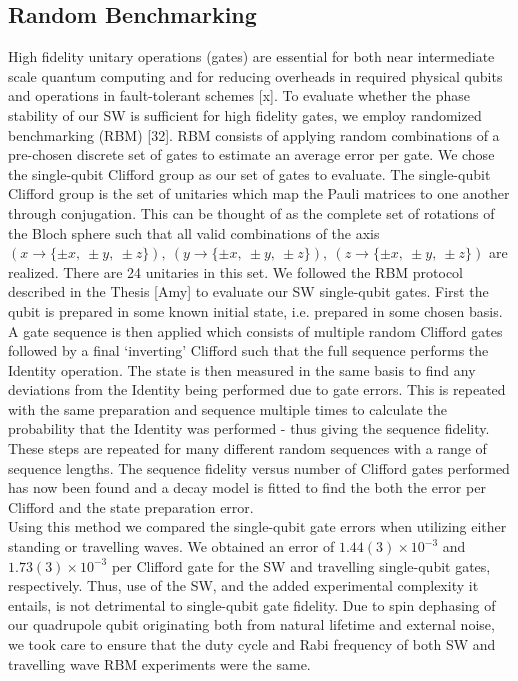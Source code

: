 \documentclass[12pt]{iopart}
\begin{document}
\subsection{Random Benchmarking}

    High fidelity unitary operations (gates) are essential for both
    near intermediate scale quantum computing and for reducing
    overheads in required physical qubits and operations in
    fault-tolerant schemes [x]. To evaluate whether the phase
    stability of our SW is sufficient for high fidelity gates, we
    employ randomized benchmarking (RBM) [32].  RBM consists of
    applying random combinations of a pre-chosen discrete set of gates
    to estimate an average error per gate.  We chose the single-qubit
    Clifford group as our set of gates to evaluate. The single-qubit
    Clifford group is the set of unitaries which map the Pauli
    matrices to one another through conjugation. This can be thought
    of as the complete set of rotations of the Bloch sphere such that
    all valid combinations of the axis
    $(x \rightarrow \{\pm x,~\pm y,~\pm z\}),~(y \rightarrow \{\pm x,~\pm y,~\pm z\}),~(z \rightarrow \{\pm x,~\pm y,~\pm z\})$
    are realized. There are 24 unitaries in this set. We followed the
    RBM protocol described in the Thesis [Amy] to evaluate our SW
    single-qubit gates. First the qubit is prepared in some known
    initial state, i.e. prepared in some chosen basis. A gate sequence
    is then applied which consists of multiple random Clifford gates
    followed by a final `inverting' Clifford such that the full
    sequence performs the Identity operation. The state is then
    measured in the same basis to find any deviations from the
    Identity being performed due to gate errors. This is repeated with
    the same preparation and sequence multiple times to calculate the
    probability that the Identity was performed - thus giving the
    sequence fidelity. These steps are repeated for many different
    random sequences with a range of sequence lengths. The sequence
    fidelity versus number of Clifford gates performed has now been
    found and a decay model is fitted to find the both the error per
    Clifford and the state preparation error.\\
    Using this method we compared the single-qubit gate errors when
    utilizing either standing or travelling waves. We obtained an
    error of $1.44(3) \times 10^{-3}$ and $1.73(3) \times 10^{-3}$ per
    Clifford gate for the SW and travelling single-qubit gates,
    respectively. Thus, use of the SW, and the added experimental
    complexity it entails, is not detrimental to single-qubit gate
    fidelity. Due to spin dephasing of our quadrupole qubit
    originating both from natural lifetime and external noise, we took
    care to ensure that the duty cycle and Rabi frequency of both SW
    and travelling wave RBM experiments were the same. \\
\end{document}
